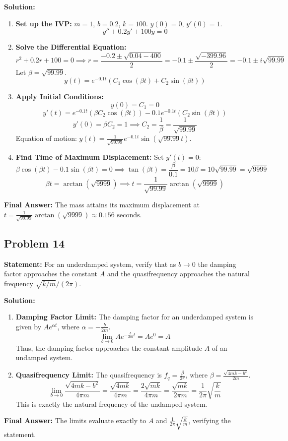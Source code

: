 \documentclass[11pt]{article}
\begin{document}
\textbf{Solution:}
\begin{enumerate}
    \item \textbf{Set up the IVP:}
    $m = 1$, $b = 0.2$, $k = 100$. $y(0) = 0$, $y'(0) = 1$.
    \[ y'' + 0.2y' + 100y = 0 \]
    
    \item \textbf{Solve the Differential Equation:}
    \[ r^2 + 0.2r + 100 = 0 \implies r = \frac{-0.2 \pm \sqrt{0.04 - 400}}{2} = -0.1 \pm \frac{\sqrt{-399.96}}{2} = -0.1 \pm i\sqrt{99.99} \]
    Let $\beta = \sqrt{99.99}$.
    \[ y(t) = e^{-0.1t}(C_1 \cos(\beta t) + C_2 \sin(\beta t)) \]
    
    \item \textbf{Apply Initial Conditions:}
    \[ y(0) = C_1 = 0 \]
    \[ y'(t) = e^{-0.1t}(\beta C_2 \cos(\beta t)) - 0.1e^{-0.1t}(C_2 \sin(\beta t)) \]
    \[ y'(0) = \beta C_2 = 1 \implies C_2 = \frac{1}{\beta} = \frac{1}{\sqrt{99.99}} \]
    Equation of motion: $y(t) = \frac{1}{\sqrt{99.99}} e^{-0.1t} \sin(\sqrt{99.99}t)$.
    
    \item \textbf{Find Time of Maximum Displacement:}
    Set $y'(t) = 0$:
    \[ \beta \cos(\beta t) - 0.1 \sin(\beta t) = 0 \implies \tan(\beta t) = \frac{\beta}{0.1} = 10\beta = 10\sqrt{99.99} = \sqrt{9999} \]
    \[ \beta t = \arctan(\sqrt{9999}) \implies t = \frac{1}{\sqrt{99.99}} \arctan(\sqrt{9999}) \]
\end{enumerate}
\textbf{Final Answer:} The mass attains its maximum displacement at $t = \frac{1}{\sqrt{99.99}} \arctan(\sqrt{9999}) \approx 0.156 \text{ seconds}$.

\subsection{Problem 14}
\textbf{Statement:} For an underdamped system, verify that as $b \to 0$ the damping factor approaches the constant $A$ and the quasifrequency approaches the natural frequency $\sqrt{k/m}/(2\pi)$.

\textbf{Solution:}
\begin{enumerate}
    \item \textbf{Damping Factor Limit:}
    The damping factor for an underdamped system is given by $A e^{\alpha t}$, where $\alpha = -\frac{b}{2m}$.
    \[ \lim_{b \to 0} A e^{-\frac{b}{2m}t} = A e^{0} = A \]
    Thus, the damping factor approaches the constant amplitude $A$ of an undamped system.
    
    \item \textbf{Quasifrequency Limit:}
    The quasifrequency is $f_q = \frac{\beta}{2\pi}$, where $\beta = \frac{\sqrt{4mk - b^2}}{2m}$.
    \[ \lim_{b \to 0} \frac{\sqrt{4mk - b^2}}{4\pi m} = \frac{\sqrt{4mk}}{4\pi m} = \frac{2\sqrt{mk}}{4\pi m} = \frac{\sqrt{mk}}{2\pi m} = \frac{1}{2\pi} \sqrt{\frac{k}{m}} \]
    This is exactly the natural frequency of the undamped system.
\end{enumerate}
\textbf{Final Answer:} The limits evaluate exactly to $A$ and $\frac{1}{2\pi}\sqrt{\frac{k}{m}}$, verifying the statement.
\end{document}
